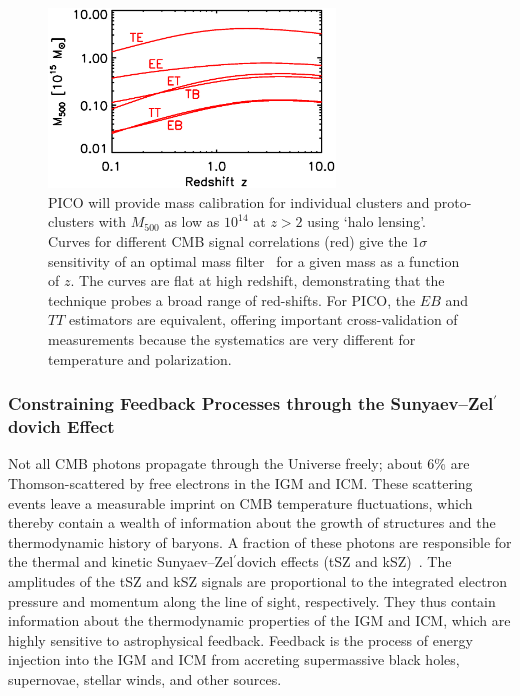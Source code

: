 \documentclass[PICOReport.tex]{subfiles}
\begin{document}
\begin{figure}[t]
\hspace{-0.1in}
\parbox{3.1in}{\centerline {
\includegraphics[width=3.0in]{images/m500lim_vs_z_pico_polar_v3.eps} } }
\hspace{0.in}
\parbox{3.4in}{
\caption{\captiontext 
PICO will provide mass calibration for individual clusters and proto-clusters with $M_{500}$ as low as $10^{14}$ at $z>2$ using `halo lensing'. Curves for different CMB signal correlations (red) give the $1\sigma$ sensitivity of an optimal mass filter~\citep{2015A&A...578A..21M} for a given mass as a function of $z$.  The curves are flat at high redshift, demonstrating that the technique probes a broad range of red-shifts. For PICO, the $EB$ and $TT$ estimators are equivalent, offering important cross-validation of measurements because the systematics are very different for temperature and polarization. 
\label{fig:HaloLensing} 
} }
\vspace{-0.1in}
\end{figure}

\subsubsection{Constraining Feedback Processes through the Sunyaev--Zel$^{\prime}$dovich Effect}
\label{sec:sz}



Not all CMB photons propagate through the Universe freely; about 6\% are Thomson-scattered by free electrons in the \ac{IGM} and \ac{ICM}.  These scattering events leave a measurable imprint on \ac{CMB} temperature fluctuations, which thereby contain a wealth of information about the growth of structures and the thermodynamic history of baryons. A fraction of these photons are responsible for the thermal and kinetic Sunyaev--Zel$^{\prime}$dovich effects (tSZ and kSZ)~\citep{zeldovich69,SZ1972}. The amplitudes of the tSZ and kSZ signals are proportional to the integrated electron pressure and momentum along the line of sight, respectively.  They thus contain information about the thermodynamic properties of the \ac{IGM} and \ac{ICM}, which are highly sensitive to astrophysical feedback. Feedback is the process of energy injection into the \ac{IGM} and \ac{ICM} from accreting supermassive black holes, supernovae, stellar winds, and other sources. 
\end{document}
